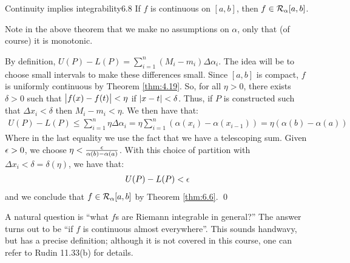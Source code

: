 \begin{theorem}{Continuity implies integrability}{6.8}
    If $f$ is continuous on $[a, b]$, then $f \in \mathcal{R}_\alpha[a, b]$. 
\end{theorem}
\noindent Note in the above theorem that we make no assumptions on $\alpha$, only that (of course) it is monotonic.
\begin{nproof}
    By definition, $U(P) - L(P) = \sum_{i=1}^n (M_i - m_i)\Delta \alpha_i$. The idea will be to choose small intervals to make these differences small. Since $[a, b]$ is compact, $f$ is uniformly continuous by Theorem \ref{thm:4.19}. So, for all $\eta > 0$, there exists $\delta > 0$ such that $\abs{f(x) - f(t)} < \eta$ if $\abs{x - t} < \delta$. Thus, if $P$ is constructed such that $\Delta x_i < \delta$ then $M_i - m_i < \eta$. We then have that:
    \begin{align*}
        U(P) - L(P) \leq \sum_{i=1}^n \eta \Delta \alpha_i = \eta \sum_{i=1}^n (\alpha(x_{i}) - \alpha(x_{i-1})) = \eta\left(\alpha(b) - \alpha(a)\right)
    \end{align*}
    Where in the last equality we use the fact that we have a telescoping sum. Given $\epsilon > 0$, we choose $\eta < \frac{\epsilon}{\alpha(b) - \alpha(a)}$. With this choice of partition with $\Delta x_i < \delta = \delta(\eta)$, we have that:
    \begin{align*}
        U(P) - L(P) < \epsilon
    \end{align*}
    and we conclude that $f \in \mathcal{R}_\alpha[a, b]$ by Theorem \ref{thm:6.6}. \qed
\end{nproof}
\noindent A natural question is ``what $f$s are Riemann integrable in general?'' The answer turns out to be ``if $f$ is continuous almost everywhere''. This sounds handwavy, but has a precise definition; although it is not covered in this course, one can refer to Rudin 11.33(b) for details. 

